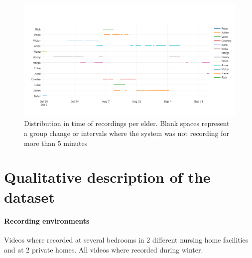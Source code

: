 \documentclass[oneside, twocolumn]{article}
\begin{document}
\begin{figure}
  \centering
    \includegraphics[width=1.0\textwidth]{images/recording_timeline}
  \caption{Distribution in time of recordings per elder. Blank spaces represent a group change or intervals where the system was not recording for more than 5 minutes}
  \label{fig:timeline}
\end{figure}


\section{Qualitative description of the dataset}
\label{sec:properties}
\paragraph{Recording environments}
Videos where recorded at several bedrooms in 2 different nursing home facilities and at 2 private homes. All videos where recorded during winter.
\end{document}
